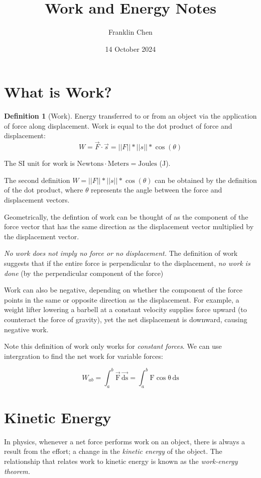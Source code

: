 \documentclass[12pt, a4paper]{article}
\title{Work and Energy Notes}
\author{Franklin Chen}
\date{14 October 2024}
\theoremstyle{definition}
\newtheorem{definition}{Definition}
\begin{document}
\maketitle
\newpage

\section{What is Work?}

\begin{definition}[Work]
Energy transferred to or from an object via the application of force along displacement. Work is equal to the dot product of force and displacement:
\[W = \vec{F} \cdot{} \vec{s} = ||F|| * ||s|| * \cos(\theta)\]

The SI unit for work is $\mathrm{Newtons \cdot{} Meters = Joules}$ (J).
\end{definition}
The second definition $W = ||F|| * ||s|| * \cos(\theta)$ can be obtained by the definition of the dot product, where $\theta$ represents the angle between the force and displacement vectors.

Geometrically, the defintion of work can be thought of as the component of the force vector that has the same direction as the displacement vector multiplied by the displacement vector.

\emph{No work does not imply no force or no displacement.} The definition of work suggests that if the entire force is perpendicular to the displacement, \emph{no work is done} (by the perpendicular component of the force)

Work can also be negative, depending on whether the component of the force points in the same or opposite direction as the displacement. For example, a weight lifter lowering a barbell at a constant velocity supplies force upward (to counteract the force of gravity), yet the net displacement is downward, causing negative work.

Note this definition of work only works for \emph{constant forces}. We can use intergration to find the net work for variable forces:

\[W_{ab} = \int_{a}^{b} \mathrm{\vec{F} \, \vec{ds}} = \int_{a}^{b} \mathrm{F\cos{\theta}\, ds}\]
\newpage

\section{Kinetic Energy}
In physics, whenever a net force performs work on an object, there is always a result from the effort; a change in the \emph{kinetic energy} of the object. The relationship that relates work to kinetic energy is known as the \emph{work-energy theorem.}\newline
\end{document}
